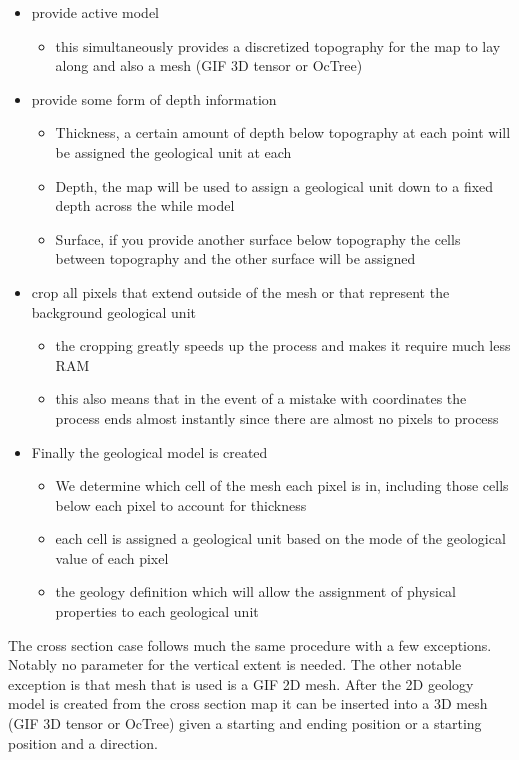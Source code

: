 \begin{itemize}
\item provide active model	
\begin{itemize}
	\item this simultaneously provides a discretized topography for the map to lay along and also a mesh (\ac{GIF} 3D tensor or OcTree) 
\end{itemize}
\item provide some form of depth information
\begin{itemize}
	\item Thickness, a certain amount of depth below topography at each point will be assigned the geological unit at each 
	\item Depth, the map will be used to assign a geological unit down to a fixed depth across the while model
	\item Surface, if you provide another surface below topography the cells between topography and the other surface will be assigned
\end{itemize}

\item crop all pixels that extend outside of the mesh or that represent the background geological unit
\begin{itemize}
	\item the cropping greatly speeds up the process and makes it require much less RAM
	\item this also means that in the event of a mistake with coordinates the process ends almost instantly since there are almost no pixels to process
\end{itemize}
\item Finally the geological model is created
\begin{itemize}
	\item We determine which cell of the mesh each pixel is in, including those cells below each pixel to account for thickness
	\item each cell is assigned a geological unit based on the mode of the geological value of each pixel
	\item the geology definition which will allow the assignment of physical properties to each geological unit
\end{itemize}
\end{itemize}

The cross section case follows much the same procedure with a few exceptions. Notably no parameter for the vertical extent is needed. The other notable exception is that mesh that is used is a \ac{GIF} 2D mesh. After the 2D geology model is created from the cross section map it can be inserted into a 3D mesh (\ac{GIF} 3D tensor or OcTree) given a starting and ending position or a starting position and a direction.

